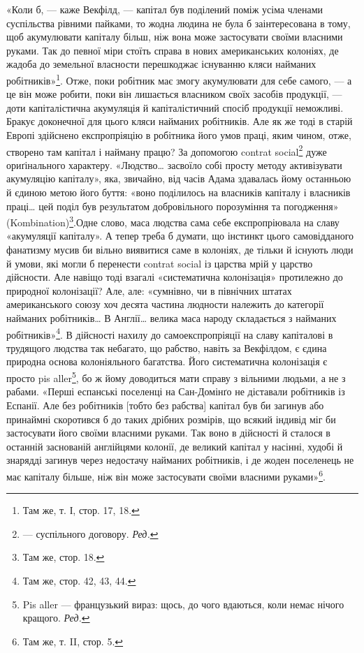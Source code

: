«Коли б, — каже Векфілд, — капітал був поділений поміж усіма членами суспільства рівними пайками, то
жодна людина не була б заінтересована в тому, щоб акумулювати капіталу більш, ніж вона може
застосувати своїми власними руками. Так до певної міри стоїть справа в нових американських колоніях,
де жадоба до земельної власности перешкоджає існуванню кляси найманих робітників»\footnote{Там же, т. І, стор. 17, 18.
}. Отже, поки
робітник має змогу акумулювати для себе самого, — а це він може робити, поки він лишається власником
своїх засобів продукції, — доти капіталістична акумуляція й капіталістичний спосіб продукції
неможливі. Бракує доконечної для цього кляси найманих робітників. Але як же тоді в старій Европі
здійснено експропріяцію в робітника його умов праці, яким чином, отже, створено там капітал і
найману працю? За допомогою contrat social\footnote*{ — суспільного договору. \emph{Ред.}} дуже ориґінального характеру. «Людство\dots{} засвоїло собі
просту методу активізувати акумуляцію капіталу», яка, звичайно, від часів Адама здавалась йому
останньою й єдиною метою його буття: «воно поділилось на власників капіталу і власників праці\dots{} цей
поділ був результатом добровільного порозуміння та погодження» (Kombination)\footnote{Там же, стор. 18.}.Одне слово, маса
людства сама себе експропріювала на славу «акумуляції капіталу». А тепер треба б думати, що інстинкт
цього самовідданого фанатизму мусив би вільно виявитися саме в колоніях, де тільки й існують люди й
умови, які могли б перенести contrat
social із царства мрій у царство дійсности. Але навіщо тоді взагалі «систематична колонізація»
протилежно до природної колонізації? Але, але: «сумнівно, чи в північних штатах американського союзу
хоч десята частина людности належить до категорії найманих робітників\dots{} В Англії\dots{} велика маса
народу складається з найманих робітників»\footnote{
Там же, стор. 42, 43, 44.
}. В дійсності нахилу до самоекспропріяції на славу
капіталові в трудящого людства так небагато, що рабство, навіть за Векфілдом, є єдина природна
основа колоніяльного багатства. Його систематична колонізація є просто pis aller\footnote*{
Pis aller — французький вираз: щось, до чого вдаються, коли немає нічого кращого. \emph{Ред.}
}, бо ж йому
доводиться мати справу з вільними людьми, а не з рабами. «Перші еспанські поселенці на Сан-Домінґо
не діставали робітників із Еспанії. Але без робітників [тобто без рабства] капітал був би загинув
або принаймні скоротився б до таких дрібних розмірів, що всякий індивід міг би застосувати його
своїми власними руками. Так воно в дійсності й сталося в останній заснованій англійцями колонії, де
великий капітал у насінні, худобі й знарядді загинув через недостачу найманих робітників, і де жоден
поселенець не має капіталу більше, ніж він може застосувати своїми власними руками»\footnote{
Там же, т. II, стор. 5.
}.

